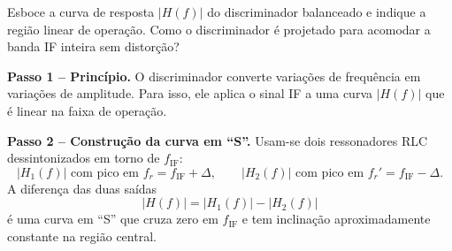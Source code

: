 \documentclass[11pt,a4paper]{article}
\begin{document}
\begin{enunciado}[Item e)]
Esboce a curva de resposta $|H(f)|$ do discriminador balanceado e indique a região linear de operação. Como o discriminador é projetado para acomodar a banda IF inteira sem distorção?
\end{enunciado}

\begin{resolucao}

\textbf{Passo 1 -- Princípio.} O discriminador converte variações de frequência em variações de amplitude. Para isso, ele aplica o sinal IF a uma curva $|H(f)|$ que é linear na faixa de operação.

\textbf{Passo 2 -- Construção da curva em ``S''.} Usam-se dois ressonadores RLC dessintonizados em torno de $f_{\text{IF}}$:
\[
  |H_1(f)| \text{ com pico em } f_r = f_{\text{IF}} + \Delta, \qquad
  |H_2(f)| \text{ com pico em } f_r' = f_{\text{IF}} - \Delta.
\]
A diferença das duas saídas
\[
  |H(f)| = |H_1(f)| - |H_2(f)|
\]
é uma curva em ``S'' que cruza zero em $f_{\text{IF}}$ e tem inclinação aproximadamente constante na região central.

\begin{center}
\end{center}
\end{resolucao}
\end{document}
